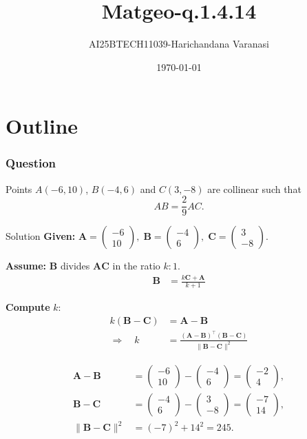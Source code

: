 \documentclass{beamer}
\title{Matgeo-q.1.4.14}
\author{AI25BTECH11039-Harichandana Varanasi}
\date{\today}
\theoremstyle{remark}
\newcommand{\myvec}[1]{\ensuremath{\begin{pmatrix}#1\end{pmatrix}}}
\let\vec\mathbf
\begin{document}
\begin{frame}
\titlepage
\end{frame}

\section*{Outline}


\begin{frame}
\frametitle{Question}
\item Points $A(-6,10)$, $B(-4,6)$ and $C(3,-8)$ are collinear such that 
\[
AB = \frac{2}{9}AC.
\]

\end{frame}
%
\begin{frame}[t]{Solution}
\small
\textbf{Given:}\;
$\vec{A}=\myvec{-6\\10},\;
 \vec{B}=\myvec{-4\\6},\;
 \vec{C}=\myvec{3\\-8}.$

\medskip
\textbf{Assume:}\; $\vec{B}$ divides $\vec{A}\vec{C}$ in the ratio $k:1$.
\begin{align*}
\vec{B}&=\frac{k\vec{C}+\vec{A}}{k+1}
\end{align*}

\textbf{Compute }$k$:
\begin{align*}
k(\vec{B}-\vec{C})&=\vec{A}-\vec{B}\\[-2pt]
\Rightarrow\quad
k&=\frac{(\vec{A}-\vec{B})^\top(\vec{B}-\vec{C})}{\|\vec{B}-\vec{C}\|^2}
\end{align*}

\begin{align*}
\vec{A}-\vec{B}&=\myvec{-6\\10}-\myvec{-4\\6}=\myvec{-2\\4},\\[-2pt]
\vec{B}-\vec{C}&=\myvec{-4\\6}-\myvec{3\\-8}=\myvec{-7\\14},\\[-2pt]
\|\vec{B}-\vec{C}\|^2&=(-7)^2+14^2=245.
\end{align*}
\end{frame}
\end{document}
